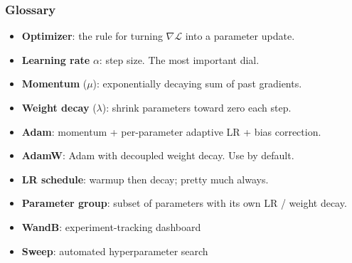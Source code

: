 \begin{frame}
\small{
\frametitle{Glossary}
\begin{itemize}
    \item \textbf{Optimizer}: the rule for turning $\nabla \mathcal{L}$ into a parameter update.
    \item \textbf{Learning rate} $\alpha$: step size. The most important dial.
    \item \textbf{Momentum} ($\mu$): exponentially decaying sum of past gradients.
    \item \textbf{Weight decay} ($\lambda$): shrink parameters toward zero each step.
    \item \textbf{Adam}: momentum + per-parameter adaptive LR + bias correction.
    \item \textbf{AdamW}: Adam with decoupled weight decay. Use by default.
    \item \textbf{LR schedule}: warmup then decay; pretty much always.
    \item \textbf{Parameter group}: subset of parameters with its own LR / weight decay.
    \item \textbf{WandB}: experiment-tracking dashboard
    \item \textbf{Sweep}: automated hyperparameter search


\end{itemize}
}
\end{frame}


